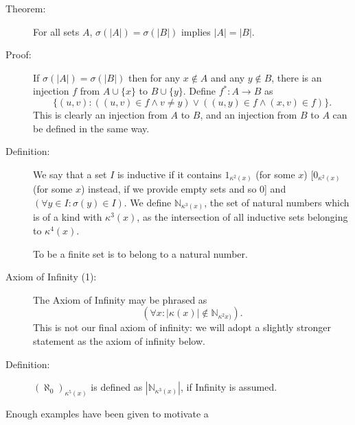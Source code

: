 \documentclass[12pt]{article}
\begin{document}
\begin{description}
\item[Theorem:]  For all sets $A$, $\sigma(|A|) = \sigma(|B|)$ implies $|A|=|B|$.

\item[Proof:]  If $\sigma(|A|) = \sigma(|B|)$ then for any $x \not\in A$ and any $y \not\in B$, there is an injection $f$ from $A \cup \{x\}$ to $B\cup \{y\}$.  Define $f^*:A \rightarrow B$ as $$\{(u,v):((u,v) \in f \wedge v \neq y) \vee ((u,y) \in f \wedge (x,v) \in f)\}.$$  This is clearly an injection from $A$ to $B$, and an injection from $B$ to $A$ can be defined in the same way.

\item[Definition:]  We say that a set $I$ is inductive if it contains $1_{\kappa^2(x)}$ (for some $x$) [$0_{\kappa^2(x)}$ (for some $x$) instead, if we provide empty sets and so 0] and $(\forall y \in I:\sigma(y) \in I)$.  We define ${\mathbb N}_{\kappa^3(x)}$, the set of natural numbers which is of a kind with $\kappa^3(x)$, as the intersection of all inductive sets belonging to $\kappa^4(x)$.

To be a finite set is to belong to a natural number.

\item[Axiom of Infinity (1):]  The Axiom of Infinity may be phrased as $$(\forall x:|\kappa(x)| \not\in {\mathbb N}_{\kappa^2x)}).$$  This is not our final axiom of infinity:  we will adopt a slightly stronger statement as the axiom of infinity below.


\item[Definition:]  $(\aleph_0)_{\kappa^5(x)}$ is defined as $|{\mathbb N}_{\kappa^3(x)}| $, if Infinity is assumed.



\end{description}


Enough examples have been given to motivate a 
\end{document}
